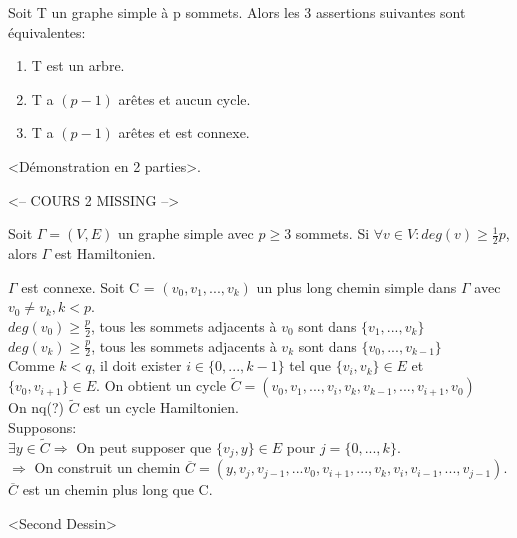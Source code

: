 \begin{thrm}
Soit T un graphe simple à p sommets. Alors les 3 assertions suivantes sont équivalentes:
	\begin{enumerate}
	\item T est un arbre.
	\item T a $(p-1)$ arêtes et aucun cycle.
	\item T a $(p-1)$ arêtes et est connexe.
	\end{enumerate}
\end{thrm}

\begin{demo}
<Démonstration en 2 parties>.
\end{demo}


\newpage
<-- COURS 2 MISSING -->
\newpage


\begin{thrm}[Dirac 1950]
Soit $\Gamma = (V,E)$ un graphe simple avec $p \geq 3$ sommets. Si $\forall v \in V: deg(v) \geq \frac{1}{2}p$, alors $\Gamma$ est Hamiltonien.
\end{thrm}

\begin{demo}
$\Gamma$ est connexe. Soit C = $(v_{0},v_{1},...,v_{k})$ un plus long chemin simple dans $\Gamma$ avec $v_{0} \neq v_{k}, k < p$.\\

$ deg(v_{0}) \geq \frac{p}{2}$, tous les sommets adjacents à $v_{0}$ sont dans $\{v_{1},...,v_{k}\}$\\

$ deg(v_{k}) \geq \frac{p}{2}$, tous les sommets adjacents à $v_{k}$ sont dans $\{v_{0},...,v_{k-1}\}$\\

Comme $k < q$, il doit exister $i \in \{0,...,k-1\}$ tel que $\{v_{i},v_{k}\} \in E$ et $\{v_{0},v_{i+1}\} \in E$. On obtient un cycle $\widetilde{C} = (v_{0},v_{1},...,v_{i},v_{k},v_{k-1},...,v_{i+1},v_{0})$ \\



On nq(?) $\widetilde{C}$ est un cycle Hamiltonien.\\

Supposons:\\

$\exists  y \in \widetilde{C} \Rightarrow$ On peut supposer que $\{ v_{j},y\} \in E$ pour $j=\{0,...,k\}$.\\

$\Rightarrow$ On construit un chemin $\overline{C} = (y, v_{j},v_{j-1},...v_{0},v_{i+1},...,v_{k},v_{i},v_{i-1},...,v_{j-1})$. $\overline{C}$ est un chemin plus long que C.

<Second Dessin>

\end{demo}

